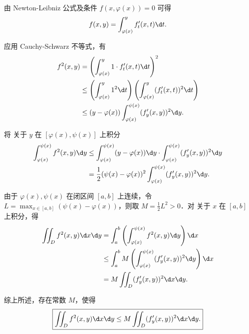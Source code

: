 \begin{myproof}
    由 Newton-Leibniz 公式及条件 $f(x, \varphi(x)) = 0$ 可得
    \begin{equation}
        f(x, y) = \int_{\varphi(x)}^y f'_t(x, t) \d t. \label{eq:Fundamental-Thm}
    \end{equation}

    应用 Cauchy-Schwarz 不等式，有
    \begin{equation}
        \begin{aligned}
            f^2(x, y) & = \left( \int_{\varphi(x)}^y 1 \cdot f'_t(x, t) \d t \right)^2                                         \\
                      & \le \left( \int_{\varphi(x)}^y 1^2 \d t \right) \left( \int_{\varphi(x)}^y (f'_t(x, t))^2 \d t \right) \\
                      & \le (y - \varphi(x)) \int_{\varphi(x)}^{\psi(x)} (f'_y(x, y))^2 \d y.
        \end{aligned} \label{eq:CS-Inequality}
    \end{equation}

    将  关于 $y$ 在 $[\varphi(x), \psi(x)]$ 上积分
    \begin{equation}
        \begin{aligned}
            \int_{\varphi(x)}^{\psi(x)} f^2(x, y) \d y & \le \int_{\varphi(x)}^{\psi(x)} (y - \varphi(x)) \d y \cdot \int_{\varphi(x)}^{\psi(x)} (f'_y(x, y))^2 \d y \\
                                                       & = \frac{1}{2} (\psi(x) - \varphi(x))^2 \int_{\varphi(x)}^{\psi(x)} (f'_y(x, y))^2 \d y.
        \end{aligned} \label{eq:Integral-Y}
    \end{equation}

    由于 $\varphi(x), \psi(x)$ 在闭区间 $[a, b]$ 上连续，令 $L = \max_{x \in [a, b]} (\psi(x) - \varphi(x))$，则取 $M = \frac{1}{2} L^2 > 0$．对  关于 $x$ 在 $[a, b]$ 上积分，得
    \begin{equation}
        \begin{aligned}
            \iint_D f^2(x, y) \d x \d y & = \int_a^b \left( \int_{\varphi(x)}^{\psi(x)} f^2(x, y) \d y \right) \d x          \\
                                        & \le \int_a^b M \left( \int_{\varphi(x)}^{\psi(x)} (f'_y(x, y))^2 \d y \right) \d x \\
                                        & = M \iint_D (f'_y(x, y))^2 \d x \d y.
        \end{aligned}
    \end{equation}

    综上所述，存在常数 $M$，使得
    \begin{equation}
        \boxed{\iint_D f^2(x, y) \d x \d y \le M \iint_D (f'_y(x, y))^2 \d x \d y.}
    \end{equation}
\end{myproof}

